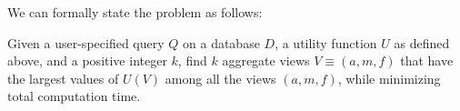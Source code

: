 
We can formally state the \SeeDB problem as follows:


\begin{problem}
\vspace{-5pt}
Given a user-specified query $Q$ on a database $D$, a utility function $U$ as defined
above, and a positive integer $k$, find $k$ aggregate views $V \equiv (a, m, f)$ that
have the largest values of $U(V)$ among all the views $(a, m, f)$, 
while minimizing total computation time.
\vspace{-5pt}
\end{problem}

